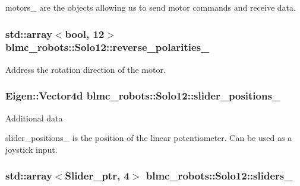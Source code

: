 motors\+\_\+ are the objects allowing us to send motor commands and receive data. 

\subsubsection[{\texorpdfstring{reverse\+\_\+polarities\+\_\+}{reverse_polarities_}}]{\setlength{\rightskip}{0pt plus 5cm}std\+::array$<$bool, 12$>$ blmc\+\_\+robots\+::\+Solo12\+::reverse\+\_\+polarities\+\_\+\hspace{0.3cm}{\ttfamily [private]}}\hypertarget{classblmc__robots_1_1Solo12_ace2b1af72676f4ec2d285f6166ba6922}{}\label{classblmc__robots_1_1Solo12_ace2b1af72676f4ec2d285f6166ba6922}


Address the rotation direction of the motor. 

\subsubsection[{\texorpdfstring{slider\+\_\+positions\+\_\+}{slider_positions_}}]{\setlength{\rightskip}{0pt plus 5cm}Eigen\+::\+Vector4d blmc\+\_\+robots\+::\+Solo12\+::slider\+\_\+positions\+\_\+\hspace{0.3cm}{\ttfamily [private]}}\hypertarget{classblmc__robots_1_1Solo12_a67948750642c1e62f4aeadb4adac3bdd}{}\label{classblmc__robots_1_1Solo12_a67948750642c1e62f4aeadb4adac3bdd}




 Additional data 

slider\+\_\+positions\+\_\+ is the position of the linear potentiometer. Can be used as a joystick input. 
\subsubsection[{\texorpdfstring{sliders\+\_\+}{sliders_}}]{\setlength{\rightskip}{0pt plus 5cm}std\+::array$<${\bf Slider\+\_\+ptr}, 4$>$ blmc\+\_\+robots\+::\+Solo12\+::sliders\+\_\+\hspace{0.3cm}{\ttfamily [private]}}\hypertarget{classblmc__robots_1_1Solo12_a4119af8c0b732d5559f8d71a9714ac29}{}\label{classblmc__robots_1_1Solo12_a4119af8c0b732d5559f8d71a9714ac29}


